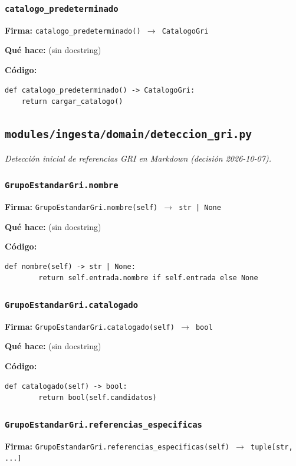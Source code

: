 \documentclass[11pt,a4paper]{article}
\begin{document}
\subsubsection*{\texttt{catalogo\_predeterminado}}
\textbf{Firma:} \texttt{catalogo\_predeterminado() $\rightarrow$ CatalogoGri}

\textbf{Qué hace:} (sin docstring)

\textbf{Código:}
\begin{lstlisting}
def catalogo_predeterminado() -> CatalogoGri:
    return cargar_catalogo()
\end{lstlisting}

\subsection{\texttt{modules/ingesta/domain/deteccion\_gri.py}}
\textit{Detección inicial de referencias GRI en Markdown (decisión 2026-10-07).}

\subsubsection*{\texttt{GrupoEstandarGri.nombre}}
\textbf{Firma:} \texttt{GrupoEstandarGri.nombre(self) $\rightarrow$ str | None}

\textbf{Qué hace:} (sin docstring)

\textbf{Código:}
\begin{lstlisting}
def nombre(self) -> str | None:
        return self.entrada.nombre if self.entrada else None
\end{lstlisting}

\subsubsection*{\texttt{GrupoEstandarGri.catalogado}}
\textbf{Firma:} \texttt{GrupoEstandarGri.catalogado(self) $\rightarrow$ bool}

\textbf{Qué hace:} (sin docstring)

\textbf{Código:}
\begin{lstlisting}
def catalogado(self) -> bool:
        return bool(self.candidatos)
\end{lstlisting}

\subsubsection*{\texttt{GrupoEstandarGri.referencias\_especificas}}
\textbf{Firma:} \texttt{GrupoEstandarGri.referencias\_especificas(self) $\rightarrow$ tuple[str, ...]}
\end{document}
